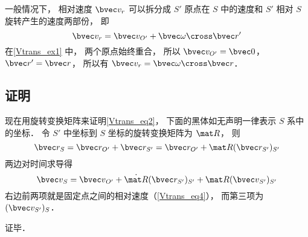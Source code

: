 一般情况下， 相对速度 $\bvec v_r$ 可以拆分成 $S'$ 原点在 $S$ 中的速度和 $S'$ 相对 $S$ 旋转产生的速度两部份， 即
\begin{equation}\label{Vtrans_eq4}
\bvec v_r = \bvec v_{O'} + \bvec \omega \cross \bvec r'
\end{equation}
在\autoref{Vtrans_ex1} 中， 两个原点始终重合， 所以 $\bvec v_{O'} = \bvec 0$， $\bvec r' = \bvec r$， 所以有 $\bvec v_r = \bvec\omega \cross \bvec r$．

\subsection{证明}
现在用旋转变换矩阵来证明\autoref{Vtrans_eq2}， 下面的黑体如无声明一律表示 $S$ 系中的坐标． 令 $S'$ 中坐标到 $S$ 坐标的旋转变换矩阵为 $\mat R$， 则
\begin{equation}
\bvec r_S = \bvec r_{O'} + \bvec r_{S'} = \bvec r_{O'} + \mat R(\bvec r_{S'})_{S'}
\end{equation}
两边对时间求导得
\begin{equation}
{\bvec v}_S = {\bvec v}_{O'} + \dot{\mat R}(\bvec r_{S'})_{S'} + \mat R ({\bvec v}_{S'})_{S'}
\end{equation}
右边前两项就是固定点之间的相对速度（\autoref{Vtrans_eq4}）， 而第三项为 $(\bvec v_{S'})_S$．

证毕．
